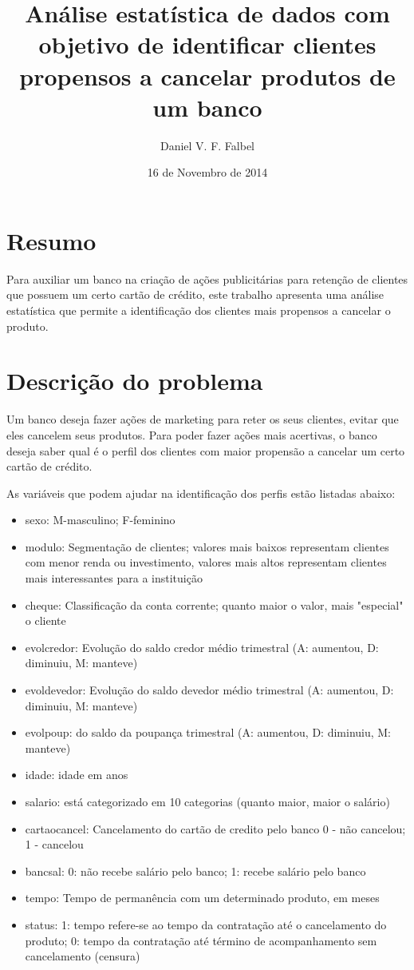 \documentclass{article}\usepackage[]{graphicx}\usepackage[]{color}
\title{Análise estatística de dados com objetivo de identificar clientes propensos a cancelar produtos de um banco}
\author{Daniel V. F. Falbel}
\date{16 de Novembro de 2014}
\begin{document}
\maketitle

\section*{Resumo}

Para auxiliar um banco na criação de ações publicitárias para retenção de clientes que possuem um certo cartão de crédito, este trabalho apresenta uma análise estatística que permite a identificação dos clientes mais propensos a cancelar o produto.

\section{Descrição do problema}

Um banco deseja fazer ações de marketing para reter os seus clientes, evitar que eles cancelem seus produtos. Para poder fazer ações mais acertivas, o banco deseja saber qual é o perfil dos clientes com maior propensão a cancelar um certo cartão de crédito.

As variáveis que podem ajudar na identificação dos perfis estão listadas abaixo: 

\begin{itemize}
  \item sexo: M-masculino; F-feminino
  \item modulo: Segmentação de clientes; valores mais baixos representam clientes com menor renda ou investimento, valores mais altos representam clientes mais interessantes para a instituição
  \item cheque: Classificação da conta corrente; quanto maior o valor, mais "especial" o cliente
  \item evolcredor: Evolução do saldo credor médio trimestral (A: aumentou, D: diminuiu, M: manteve)
  \item evoldevedor: Evolução do saldo devedor médio trimestral (A: aumentou, D: diminuiu, M: manteve)
  \item evolpoup:  do saldo da poupança trimestral (A: aumentou, D: diminuiu, M: manteve)
  \item idade: idade em anos
  \item salario: está categorizado em 10 categorias (quanto maior, maior o salário)
  \item cartaocancel: Cancelamento do cartão de credito pelo banco 0 - não cancelou; 1 - cancelou
  \item bancsal: 0: não recebe salário pelo banco; 1: recebe salário pelo banco
  \item tempo: Tempo de permanência com um determinado produto, em meses
  \item status: 1: tempo refere-se ao tempo da contratação até o cancelamento do produto; 0: tempo da contratação até término de acompanhamento sem cancelamento (censura)
\end{itemize}
\end{document}
